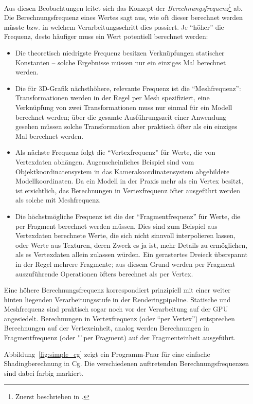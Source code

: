 \documentclass[twoside,a4paper,fleqn,12pt]{book}
\begin{document}
Aus diesen Beobachtungen leitet sich das Konzept der \emph{Berechnungsfrequenz}\footnote{Zuerst beschrieben in \cite{stanford_rtsl}.} ab.
Die Berechnungsfrequenz eines Wertes sagt aus, wie oft dieser berechnet werden müsste bzw. in welchem Verarbeitungsschritt
dies passiert. Je "`höher"' die Frequenz, desto häufiger muss ein Wert potentiell berechnet werden:
\begin{itemize}
\item Die theoretisch niedrigste Frequenz besitzen Verknüpfungen statischer Konstanten -- solche Ergebnisse müssen nur ein einziges Mal berechnet werden.
\item Die für 3D-Grafik nächsthöhere, relevante Frequenz ist die "`Meshfrequenz"': Transformationen werden in der Regel per Mesh spezifiziert,
eine Verknüpfung von zwei Transformationen muss nur einmal für ein Modell berechnet werden; über die gesamte Ausführungszeit einer Anwendung gesehen
müssen solche Transformation aber praktisch öfter als ein einziges Mal berechnet werden.
\item Als nächste Frequenz folgt die "`Vertexfrequenz"' für Werte, die von Vertexdaten abhängen. Augenscheinliches Beispiel sind
vom Objektkoordinatensystem in das Kamerakoordinatensystem abgebildete Modellkoordinaten. Da ein Modell in der Praxis mehr als ein Vertex besitzt,
ist ersichtlich, das Berechnungen in Vertexfrequenz öfter ausgeführt werden als solche mit Meshfrequenz.
\item Die höchstmögliche Frequenz ist die der "`Fragmentfrequenz"' für Werte, die per Fragment berechnet werden müssen.
Dies sind zum Beispiel aus Vertexdaten berechnete Werte, die sich nicht sinnvoll interpolieren lassen, oder Werte aus Texturen,
deren Zweck es ja ist, mehr Details zu ermöglichen, als es Vertexdaten allein zulassen würden.
Ein gerastertes Dreieck überspannt in der Regel mehrere Fragmente; aus diesem Grund werden per Fragment auszuführende Operationen
öfters berechnet als per Vertex.
\end{itemize}

Eine höhere Berechnungsfrequenz korrespondiert prinzipiell mit einer weiter hinten liegenden Verarbeitungsstufe in der Renderingpipeline.
Statische und Meshfrequenz sind praktisch sogar noch vor der Verarbeitung auf der GPU angesiedelt. Berechnungen in Vertexfrequenz (oder "`per Vertex"')
entsprechen Berechnungen auf der Vertexeinheit, analog werden Berechnungen in Fragmentfrequenz (oder "`per Fragment) auf der Fragmenteinheit ausgeführt.

Abbildung~\ref{fig:simple_cg} zeigt ein Programm-Paar für eine einfache Shadingberechnung in Cg. Die verschiedenen auftretenden Berechnungsfrequenzen
sind dabei farbig markiert. 
\end{document}
